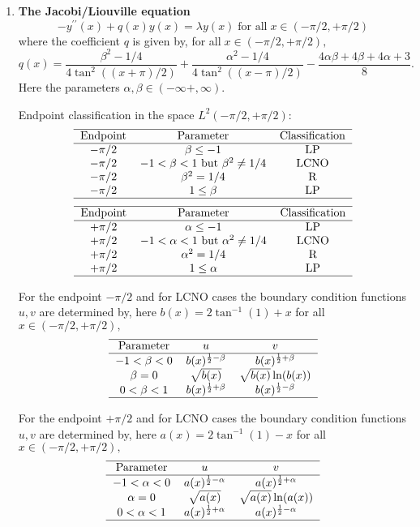 \documentclass[12pt]{amsart}%
\theoremstyle{plain}
\numberwithin{equation}{section}
\begin{document}
\begin{enumerate}
\item \textbf{The Jacobi/Liouville equation}%
\[
-y^{\prime\prime}(x)+q(x)y(x)=\lambda y(x)\;\text{for all}\;x\in(-\pi
/2,+\pi/2)
\]
where the coefficient $q$ is given by, for all$\;x\in(-\pi/2,+\pi/2),$%
\[
q(x)=\frac{\beta^{2}-1/4}{4\tan^{2}((x+\pi)/2)}+\frac{\alpha^{2}-1/4}%
{4\tan^{2}((x-\pi)/2)}-\frac{4\alpha\beta+4\beta+4\alpha+3}{8}.
\]
Here the parameters $\alpha,\beta\in(-\infty+,\infty).$

Endpoint classification in the space $L^{2}(-\pi/2,+\pi/2)$:%
\[%
\begin{tabular}
[c]{ccc}\hline
Endpoint & Parameter & Classification\\\hline
$-\pi/2$ & $\beta\leq-1$ & LP\\
$-\pi/2$ & $-1<\beta<1$ but $\beta^{2}\neq1/4$ & LCNO\\
$-\pi/2$ & $\beta^{2}=1/4$ & R\\
$-\pi/2$ & $1\leq\beta$ & LP\\\hline
\end{tabular}
\]%
\[%
\begin{tabular}
[c]{ccc}\hline
Endpoint & Parameter & Classification\\\hline
$+\pi/2$ & $\alpha\leq-1$ & LP\\
$+\pi/2$ & $-1<\alpha<1$ but $\alpha^{2}\neq1/4$ & LCNO\\
$+\pi/2$ & $\alpha^{2}=1/4$ & R\\
$+\pi/2$ & $1\leq\alpha$ & LP\\\hline
\end{tabular}
\]

For the endpoint $-\pi/2$ and for LCNO cases the boundary condition functions
$u,v$ are determined by, here $b(x)=2\tan^{-1}(1)+x$ for all $x\in(-\pi
/2,+\pi/2),$%
\[%
\begin{tabular}
[c]{ccc}\hline
Parameter & $u$ & $v$\\\hline
$-1<\beta<0$ & $b(x)^{\frac{1}{2}-\beta}$ & $b(x)^{\frac{1}{2}+\beta}$\\
$\beta=0$ & $\sqrt{b(x)}$ & $\sqrt{b(x)}\ln(b(x))$\\
$0<\beta<1$ & $b(x)^{\frac{1}{2}+\beta}$ & $b(x)^{\frac{1}{2}-\beta}$\\\hline
\end{tabular}
\]

For the endpoint $+\pi/2$ and for LCNO cases the boundary condition functions
$u,v$ are determined by, here $a(x)=2\tan^{-1}(1)-x$ for all $x\in(-\pi
/2,+\pi/2),$%
\[%
\begin{tabular}
[c]{ccc}\hline
Parameter & $u$ & $v$\\\hline
$-1<\alpha<0$ & $a(x)^{\frac{1}{2}-\alpha}$ & $a(x)^{\frac{1}{2}+\alpha}$\\
$\alpha=0$ & $\sqrt{a(x)}$ & $\sqrt{a(x)}\ln(a(x))$\\
$0<\alpha<1$ & $a(x)^{\frac{1}{2}+\alpha}$ & $a(x)^{\frac{1}{2}-\alpha}%
$\\\hline
\end{tabular}
\]


\end{enumerate}
\end{document}
